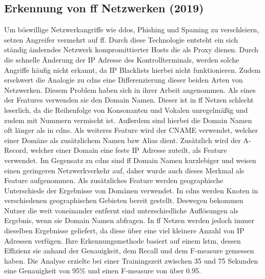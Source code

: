 \documentclass[
    12pt, %
    DIV10,
    ngerman, %
    a4paper, %
    oneside, %
    titlepage, %
    parskip=half, %
    headings=normal, %
    listof=totoc, %
    bibliography=totoc, %
    index=totoc, %
    captions=tableheading, %
    final %
]{scrreprt}
\begin{document}
\subsection{Erkennung von \acs{ff} Netzwerken (2019)}
Um böswillige Netzwerkangriffe wie \ac{ddos}, Phishing und Spaming zu verschleiern, setzen Angreifer vermehrt auf \ac{ff}. Durch diese Technologie entsteht ein sich ständig änderndes Netzwerk kompromittierter Hosts die als Proxy dienen. Durch die schnelle Änderung der IP Adresse des Kontrollterminals, werden solche Angriffe häufig nicht erkannt, da IP Blacklists hierbei nicht funktionieren. Zudem erschwert die Analogie zu \ac{cdns} eine Differenzierung dieser beiden Arten von Netzwerken.
Diesem Problem haben sich \textcite{Chen2019} in ihrer Arbeit angenommen. Als eines der Features verwenden sie den Domain Namen. Dieser ist in \ac{ff} Netzen schlecht leserlich, da die Reihenfolge von Konsonanten und Vokalen unregelmä{\ss}ig und zudem mit Nummern vermischt ist. Au{\ss}erdem sind hierbei die Domain Namen oft länger als in \ac{cdns}. Als weiteres Feature wird der CNAME verwendet, welcher einer Domäne als zusätzlichem Namen bzw Alias dient. Zusätzlich wird der A-Record, welcher einer Domain eine feste IP Adresse zuteilt, als Feature verwendet. Im Gegensatz zu \ac{cdns} sind \ac{ff} Domain Namen kurzlebiger und weisen einen geringeren Netzwerkverkehr auf, daher wurde auch dieses Merkmal als Feature aufgenommen. Als zusätzliches Feature werden geographische Unterschiede der Ergebnisse von Domänen verwendet. In \ac{cdns} werden Knoten in verschiedenen geographischen Gebieten bereit gestellt. Deswegen bekommen Nutzer die weit voneinander entfernt sind unterschiedliche Auflösungen als Ergebnis, wenn sie Domain Namen abfragen. In \ac{ff} Netzen werden jedoch immer dieselben Ergebnisse geliefert, da diese über eine viel kleinere Anzahl von IP Adressen verfügen. Ihre Erkennungsmethode basiert auf einem \ac{lstm}, dessen Effizienz sie anhand der Genauigkeit, dem Recall und dem F-measure gemessen haben. Die Analyse erzielte bei einer Trainingszeit zwischen 35 und 75 Sekunden eine Genauigkeit von 95\% und einen F-measure von über 0.95.
%
\end{document}
